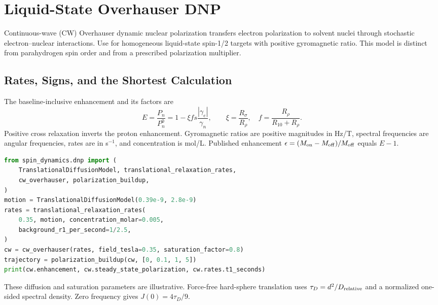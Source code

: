 \chapter{Liquid-State Overhauser DNP}
\label{chap:overhauser}

Continuous-wave (CW) Overhauser dynamic nuclear polarization transfers
electron polarization to solvent nuclei through stochastic electron--nuclear
interactions. Use  for homogeneous liquid-state
spin-1/2 targets with positive gyromagnetic ratio. This model is distinct from
parahydrogen spin order and from a prescribed polarization multiplier.


\section{Rates, Signs, and the Shortest Calculation}

The baseline-inclusive enhancement and its factors are
\[
 E=\frac{P_n}{P_n^0}=1-\xi f s\frac{|\gamma_e|}{\gamma_n},\qquad
 \xi=\frac{R_\sigma}{R_\rho},\quad
 f=\frac{R_\rho}{R_{10}+R_\rho}.
\]
Positive cross relaxation inverts the proton enhancement. Gyromagnetic ratios
are positive magnitudes in Hz/T, spectral frequencies are angular frequencies,
rates are in s$^{-1}$, and concentration is mol/L. Published enhancement
\(\epsilon=(M_{\rm on}-M_{\rm off})/M_{\rm off}\) equals \(E-1\).

\begin{lstlisting}[language=Python]
from spin_dynamics.dnp import (
    TranslationalDiffusionModel, translational_relaxation_rates,
    cw_overhauser, polarization_buildup,
)
motion = TranslationalDiffusionModel(0.39e-9, 2.8e-9)
rates = translational_relaxation_rates(
    0.35, motion, concentration_molar=0.005,
    background_r1_per_second=1/2.5,
)
cw = cw_overhauser(rates, field_tesla=0.35, saturation_factor=0.8)
trajectory = polarization_buildup(cw, [0, 0.1, 1, 5])
print(cw.enhancement, cw.steady_state_polarization, cw.rates.t1_seconds)
\end{lstlisting}

These diffusion and saturation parameters are illustrative. Force-free
hard-sphere translation uses \(\tau_D=d^2/D_{\rm relative}\) and a normalized
one-sided spectral density. Zero frequency gives \(J(0)=4\tau_D/9\).

